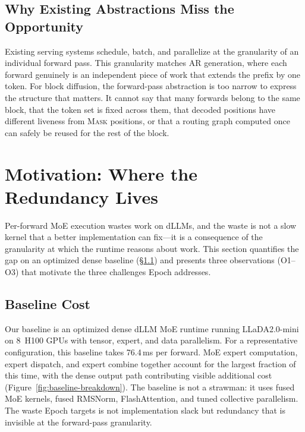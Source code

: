 \documentclass[sigconf,review,anonymous, 10pt]{acmart}
\newcommand{\sys}{Epoch}
\newcommand{\mask}{\textsc{Mask}}
\begin{document}
\subsection{Why Existing Abstractions Miss the Opportunity}

Existing serving systems schedule, batch, and parallelize at the granularity of an individual forward pass.
This granularity matches AR generation, where each forward genuinely is an independent piece of work that extends the prefix by one token.
For block diffusion, the forward-pass abstraction is too narrow to express the structure that matters.
It cannot say that many forwards belong to the same block, that the token set is fixed across them, that decoded positions have different liveness from \mask{} positions, or that a routing graph computed once can safely be reused for the rest of the block.


\section{Motivation: Where the Redundancy Lives}

Per-forward MoE execution wastes work on dLLMs, and the waste is not a slow kernel that a better implementation can fix---it is a consequence of the granularity at which the runtime reasons about work.
This section quantifies the gap on an optimized dense baseline (\S\ref{sec:baseline-cost}) and presents three observations (O1--O3) that motivate the three challenges \sys{} addresses.

\subsection{Baseline Cost}
\label{sec:baseline-cost}

Our baseline is an optimized dense dLLM MoE runtime running LLaDA2.0-mini on 8~H100 GPUs with tensor, expert, and data parallelism.
For a representative configuration, this baseline takes 76.4\,ms per forward.
MoE expert computation, expert dispatch, and expert combine together account for the largest fraction of this time, with the dense output path contributing visible additional cost (Figure~\ref{fig:baseline-breakdown}).
The baseline is not a strawman: it uses fused MoE kernels, fused RMSNorm, FlashAttention, and tuned collective parallelism.
The waste \sys{} targets is not implementation slack but redundancy that is invisible at the forward-pass granularity.
\end{document}
